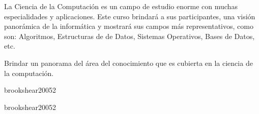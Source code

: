 \begin{syllabus}


\begin{justification}
La Ciencia de la Computación es un campo de estudio enorme con muchas especialidades y aplicaciones. Este curso brindará a sus participantes, una visión panorámica de la informática y mostrará sus campos más representativos, como son: Algoritmos, Estructuras de de Datos, Sistemas Operativos, Bases de Datos, etc.
\end{justification}

\begin{goals}
\item Brindar un panorama del área del conocimiento que es cubierta en la ciencia de la computación.
\end{goals}

\begin{outcomes}
\end{outcomes}

\begin{unit}{\DSTWODef}{brookshear2005}{2}
   \begin{topics}
      \item \DSTWOTopicLogica
      \item \DSTWOTopicConectivos
      \item \DSTWOTopicTablas
   \end{topics}

   \begin{learningoutcomes}
      \item \DSTWOObjONE
   \end{learningoutcomes}

\end{unit}

\begin{unit}{\PFONEDef}{brookshear2005}{2}

   \begin{topics}
      \item \PFONETopicSintaxis
      \item \PFONETopicVariables
      \item \PFONETopicEstructuras
   \end{topics}

   \begin{learningoutcomes}
      \item \PFONEObjONE
   \end{learningoutcomes}


\end{unit}
\end{syllabus}

